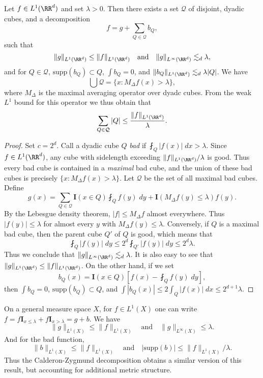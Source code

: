 \begin{theorem}
    Let $f \in L^1(\RR^d)$ and set $\lambda > 0$. Then there exists a set $\mathcal{Q}$ of disjoint, dyadic cubes, and a decomposition
    \[ f = g + \sum_{Q \in \mathcal{Q}} b_Q, \]
    such that
    \[ \| g \|_{L^1(\RR^d)} \leq \| f \|_{L^1(\RR^d)}  \quad\text{and}\quad   \| g \|_{L^\infty(\RR^d)} \lesssim_d \lambda, \]
    and for $Q \in \mathcal{Q}$, $\text{supp}(b_Q) \subset Q$, $\int b_Q = 0$, and $\| b_Q \|_{L^1(\RR^d)} \lesssim_d \lambda |Q|$. We have
    \[ \bigcup \mathcal{Q} = \{ x : M_\Delta f(x) > \lambda \}, \]
    where $M_\Delta$ is the maximal averaging operator over dyadc cubes. From the weak $L^1$ bound for this operator we thus obtain that
    \[ \sum_{Q \in \mathcal{Q}} |Q| \leq \frac{\| f \|_{L^1(\RR^d)}}{\lambda}. \]
\end{theorem}
\begin{proof}
    Set $c = 2^d$. Call a dyadic cube $Q$ \emph{bad} if $\fint_Q |f(x)|\; dx > \lambda$. Since $f \in L^1(\RR^d)$, any cube with sidelength exceeding $\| f \|_{L^1(\RR^d)} / \lambda$ is good. Thus every bad cube is contained in a \emph{maximal} bad cube, and the union of these bad cubes is precisely $\{ x : M_\Delta f(x) > \lambda \}$. Let $\mathcal{Q}$ be the set of all maximal bad cubes. Define
    \[ g(x) = \sum_{Q \in \mathcal{Q}} \mathbf{I}(x \in Q) \fint_Q f(y)\; dy + \mathbf{I}(M_\Delta f(y) \leq \lambda) f(y). \]
    By the Lebesgue density theorem, $|f| \leq M_\Delta f$ almost everywhere. Thus $|f(y)| \leq \lambda$ for almost every $y$ with $M_\Delta f(y) \leq \lambda$. Conversely, if $Q$ is a maximal bad cube, then the parent cube $Q'$ of $Q$ is good, which means that
    \[ \fint_Q |f(y)|\; dy \leq 2^d \fint_{Q'} |f(y)|\; dy \leq 2^d \lambda. \]
    Thus we conclude that $\| g \|_{L^\infty(\RR^d)} \lesssim_d \lambda$. It is also easy to see that $\| g \|_{L^1(\RR^d)} \leq \| f \|_{L^1(\RR^d)}$. On the other hand, if we set
    \[ b_Q(x) = \mathbf{I}(x \in Q) [f(x) - \fint_Q f(y)\; dy], \]
    then $\int b_Q = 0$, $\text{supp}(b_Q) \subset Q$, and $\int |b_Q(x)| \leq 2 \int_Q |f(x)|\; dx \leq 2^{d+1} \lambda$.
\end{proof}

\begin{remark}
    On a general measure space $X$, for $f \in L^1(X)$ one can write $f = f \mathbf{I}_{x \leq \lambda} + f \mathbf{I}_{x > \lambda} = g + b$. We have
    \[ \| g \|_{L^1(X)} \leq \| f \|_{L^1(X)} \quad\text{and}\quad \| g \|_{L^\infty(X)} \leq \lambda. \]
    And for the bad function,
    \[ \| b \|_{L^1(X)} \leq \| f \|_{L^1(X)} \quad\text{and}\quad |\text{supp}(b)| \leq \| f \|_{L^1(X)} / \lambda. \]
    Thus the Calderon-Zygmund decomposition obtains a similar version of this result, but accounting for additional metric structure.
\end{remark}


